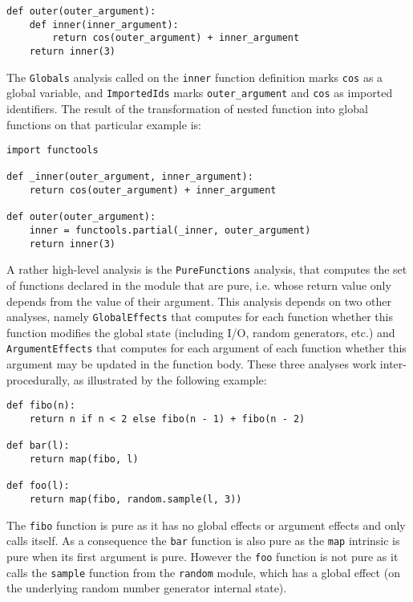 \documentclass[10pt, onecolumn, preprint]{sigplanconf}
\begin{document}
\begin{lstlisting}
def outer(outer_argument):
    def inner(inner_argument):
        return cos(outer_argument) + inner_argument
    return inner(3)
\end{lstlisting}

The \texttt{Globals} analysis called on the \texttt{inner} function definition
marks \texttt{cos} as a global variable, and \texttt{ImportedIds} marks
\texttt{outer\_argument} and \texttt{cos} as imported identifiers. The result
of the transformation of nested function into global functions on that
particular example is:

\begin{lstlisting}
import functools

def _inner(outer_argument, inner_argument):
    return cos(outer_argument) + inner_argument

def outer(outer_argument):
    inner = functools.partial(_inner, outer_argument)
    return inner(3)
\end{lstlisting}

A rather high-level analysis is the \texttt{PureFunctions} analysis, that computes the
set of functions declared in the module that are pure, i.e. whose return value
only depends from the value of their argument. This analysis depends on two
other analyses, namely \texttt{GlobalEffects} that computes for each function whether
this function modifies the global state (including I/O, random generators, etc.)
and \texttt{ArgumentEffects} that computes for each argument of each function whether
this argument may be updated in the function body. These three analyses work
inter-procedurally, as illustrated by the following example:

\begin{lstlisting}
def fibo(n):
    return n if n < 2 else fibo(n - 1) + fibo(n - 2)

def bar(l):
    return map(fibo, l)

def foo(l):
    return map(fibo, random.sample(l, 3))
\end{lstlisting}

The \texttt{fibo} function is pure as it has no global effects or argument effects and
only calls itself. As a consequence the \texttt{bar} function is also pure as the
\texttt{map} intrinsic is pure when its first argument is pure. However the \texttt{foo}
function is not pure as it calls the \texttt{sample} function from the \texttt{random}
module, which has a global effect (on the underlying random number generator
internal state).
\end{document}
